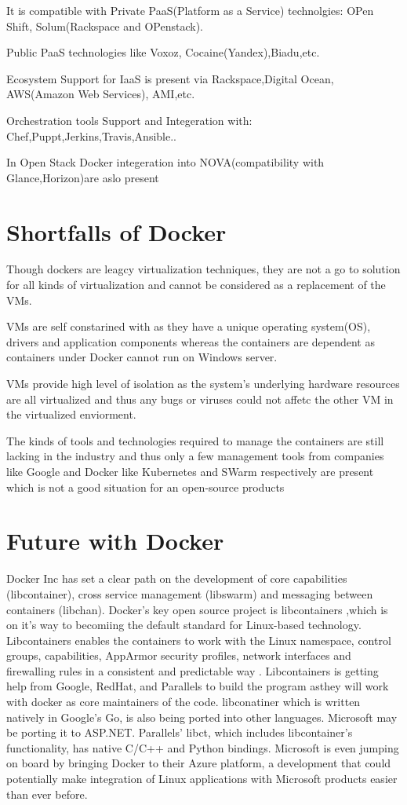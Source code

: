 \documentclass[9pt,twocolumn,twoside]{styles/osajnl}
\begin{document}
It is compatible with Private PaaS(Platform as a Service) technolgies:
OPen Shift, Solum(Rackspace and OPenstack).

Public PaaS technologies like Voxoz, Cocaine(Yandex),Biadu,etc.

Ecosystem Support for IaaS is present via Rackspace,Digital Ocean,
AWS(Amazon Web Services), AMI,etc.

Orchestration tools Support and Integeration with:
Chef,Puppt,Jerkins,Travis,Ansible..

In Open Stack Docker integeration into NOVA(compatibility with
Glance,Horizon)are aslo present

\section{Shortfalls of Docker}

Though dockers are leagcy virtualization techniques, they are not a go
to solution for all kinds of virtualization and cannot be considered
as a replacement of the VMs.

VMs are self constarined with as they have a unique operating
system(OS), drivers and application components whereas the containers
are dependent as containers under Docker cannot run on Windows server.

VMs provide high level of isolation as the system's underlying
hardware resources are all virtualized and thus any bugs or viruses
could not affetc the other VM in the virtualized enviorment.

The kinds of tools and technologies required to manage the containers
are still lacking in the industry and thus only a few management tools
from companies like Google and Docker like Kubernetes and SWarm
respectively are present which is not a good situation for an
open-source products

\section{Future with Docker}

Docker Inc has set a clear path on the development of core
capabilities (libcontainer), cross service management (libswarm) and
messaging between containers (libchan). Docker's key open source
project is libcontainers ,which is on it's way to becomiing the
default standard for Linux-based technology.  Libcontainers enables
the containers to work with the Linux namespace, control groups,
capabilities, AppArmor security profiles, network interfaces and
firewalling rules in a consistent and predictable way .
\cite{www-docker-1}Libcontainers is getting help from Google, RedHat,
and Parallels to build the program asthey will work with docker as
core maintainers of the code.  libconatiner which is written natively
in Google's Go, is also being ported into other languages. Microsoft
may be porting it to ASP.NET.  Parallels' libct, which includes
libcontainer's functionality, has native C/C++ and Python
bindings. Microsoft is even jumping on board by bringing Docker to
their Azure platform, a development that could potentially make
integration of Linux applications with Microsoft products easier than
ever before.
\end{document}

